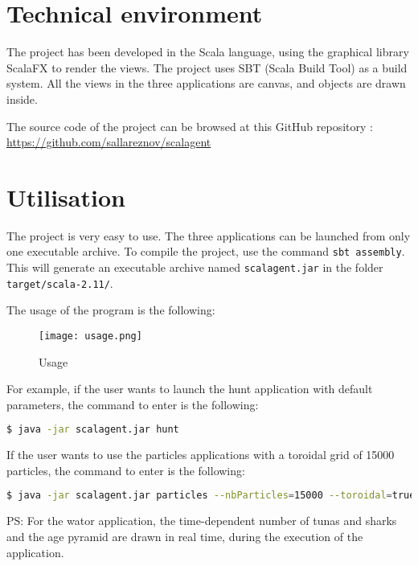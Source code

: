 \section{Technical environment}

The project has been developed in the Scala language, using the graphical library ScalaFX to render the views. The project uses SBT (Scala Build Tool) as a build system. All the views in the three applications are canvas, and objects are drawn inside.

The source code of the project can be browsed at this GitHub repository :\\ \url{https://github.com/sallareznov/scalagent}
	
\section{Utilisation}
The project is very easy to use. The three applications can be launched from only one executable archive. To compile the project, use the command \verb+sbt assembly+. This will generate an executable archive named \verb+scalagent.jar+ in the folder \verb+target/scala-2.11/+.

The usage of the program is the following:
\bigskip

\begin{figure}[H]
   \texttt{[image: usage.png]}
   \caption{Usage}
\end{figure}

For example, if the user wants to launch the hunt application with default parameters, the command to enter is the following:
\begin{lstlisting}[language=bash]
  $ java -jar scalagent.jar hunt
\end{lstlisting}
\bigskip

If the user wants to use the particles applications with a toroidal grid of 15000 particles, the command to enter is the following:
\begin{lstlisting}[language=bash]
  $ java -jar scalagent.jar particles --nbParticles=15000 --toroidal=true
\end{lstlisting}

PS: For the wator application, the time-dependent number of tunas and sharks and the age pyramid are drawn in real time, during the execution of the application.